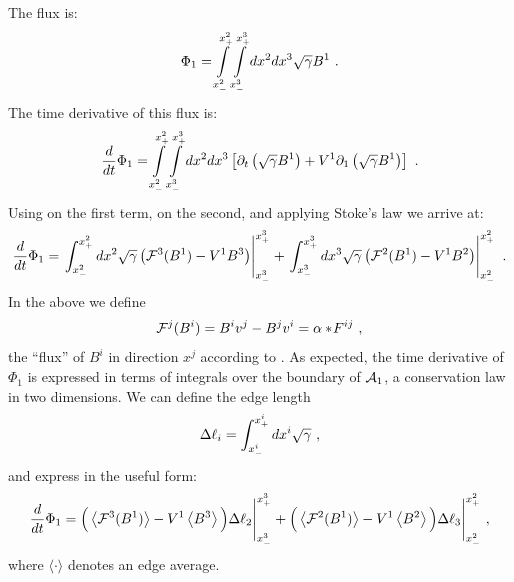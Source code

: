 The flux is:
\begin{equation}
	\Phi_1 = \int \limits_{x^2_-}^{x^2_+} \int \limits_{x^3_-}^{x^3_+} dx^2 dx^3 \sqrt{\gam} B^1\ .
\end{equation}
The time derivative of this flux is:
\begin{equation}
	\frac{d}{dt}\Phi_1 = \int \limits_{x^2_-}^{x^2_+} \int \limits_{x^3_-}^{x^3_+} dx^2 dx^3 \left[\partial_t\left(\sqrt{\gam} B^1\right) + V^1\partial_1 \left(\sqrt{\gam} B^1\right)\right]\ .
\end{equation}
Using  on the first term,  on the second, and applying Stoke's law we arrive at:
\begin{equation}
	\frac{d}{dt}\Phi_1 = \left . \int_{x^2_-}^{x^2_+}  dx^2 \sqrt{\gam} \left( \FF^3(B^1) - V^1 B^3\right) \right |^{x^3_+}_{x^3_-} + \left . \int_{x^3_-}^{x^3_+}  dx^3 \sqrt{\gam} \left( \FF^2(B^1) - V^1 B^2\right) \right |^{x^2_+}_{x^2_-}\ . \eqlabel{dphi1dt}
\end{equation}
In the above we define
\begin{equation}
	\FF^j(B^i) = B^i v^j - B^j v^i = \al \dualt{F}^{ij}\ ,
\end{equation}
the ``flux'' of $B^i$ in direction $x^j$ according to . As expected, the time derivative of $\Phi_1$ is expressed in terms of integrals over the boundary of $\AA_1$, a conservation law in two dimensions.  We can define the edge length
\begin{equation}
	\Delta \ell_i = \int_{x^i_-}^{x^i_+} dx^i \sqrt{\gam}\ ,
\end{equation}
and express  in the useful form:
\begin{equation}
	\frac{d}{dt}\Phi_1 =  \Big(\ave{\FF^3(B^1)} - V^1 \ave{B^3} \Big) \Delta \ell_2 \Bigg |^{x^3_+}_{x^3_-} + \Big( \ave{\FF^2(B^1)} - V^1 \ave{B^2}\Big)\Delta \ell_3 \Bigg |^{x^2_+}_{x^2_-}\ , \eqlabel{dphi1dtFA}
\end{equation}
where $\langle \cdot \rangle$ denotes an edge average.

